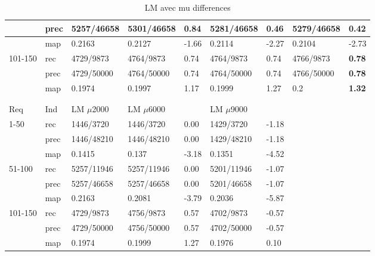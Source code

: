 \documentclass[a4paper]{article}
\begin{document}
\begin{table}[htp]
\begin{tabular}{|l|l|l|l|l|l|l|l|l|}
        & prec & 5257/46658 & 5301/46658 & 0.84   & 5281/46658 & 0.46  & 5279/46658 & 0.42  \\ \hline
        & map       & 0.2163     & 0.2127     & -1.66  & 0.2114     & -2.27 & 0.2104     & -2.73 \\ \hline
101-150 & rec    & 4729/9873  & 4764/9873  & 0.74   & 4764/9873  & 0.74  & 4766/9873  & \textbf{0.78}  \\ \hline
        & prec & 4729/50000 & 4764/50000 & 0.74   & 4764/50000 & 0.74  & 4766/50000 & \textbf{0.78}  \\ \hline
        & map       & 0.1974     & 0.1997     & 1.17   & 0.1999     & 1.27  & 0.2        & \textbf{1.32}  \\ \hline
        &           &            &            &          &            &         &            &         \\ \hline
        &           &            &            &          &            &         &            &         \\ \hline
Req & Ind & LM $\mu$2000 & LM $\mu$6000 &          & LM $\mu$9000 &         &            &         \\ \hline
1-50    & rec    & 1446/3720  & 1446/3720  & 0.00   & 1429/3720  & -1.18 &            &         \\ \hline
        & prec & 1446/48210 & 1446/48210 & 0.00   & 1429/48210 & -1.18 &            &         \\ \hline
        & map       & 0.1415     & 0.137      & -3.18  & 0.1351     & -4.52 &            &         \\ \hline
51-100  & rec    & 5257/11946 & 5257/11946 & 0.00   & 5201/11946 & -1.07 &            &         \\ \hline
        & prec & 5257/46658 & 5257/46658 & 0.00   & 5201/46658 & -1.07 &            &         \\ \hline
        & map       & 0.2163     & 0.2081     & -3.79  & 0.2036     & -5.87 &            &         \\ \hline
101-150 & rec    & 4729/9873  & 4756/9873  & 0.57   & 4702/9873  & -0.57 &            &         \\ \hline
        & prec & 4729/50000 & 4756/50000 & 0.57   & 4702/50000 & -0.57 &            &         \\ \hline
        & map       & 0.1974     & 0.1999     & 1.27   & 0.1976     & 0.10  &            &         \\ \hline
\end{tabular}
\caption{LM avec mu differences}
\label{tab:LM}
\end{table}
\end{document}
